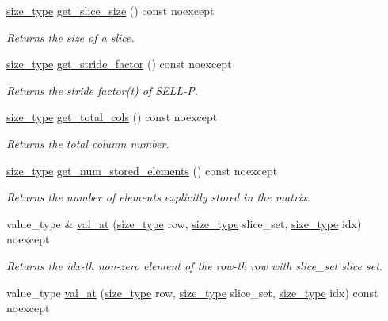 \begin{DoxyCompactItemize}
\hyperlink{namespacegko_a6e5c95df0ae4e47aab2f604a22d98ee7}{size\+\_\+type} \hyperlink{classgko_1_1matrix_1_1Sellp_a0554e79b672f35df5dd01cb467850227}{get\+\_\+slice\+\_\+size} () const noexcept
\begin{DoxyCompactList}\small\item\em Returns the size of a slice. \end{DoxyCompactList}\item 
\hyperlink{namespacegko_a6e5c95df0ae4e47aab2f604a22d98ee7}{size\+\_\+type} \hyperlink{classgko_1_1matrix_1_1Sellp_a34c7942cac3db5a9c4c0b609d2a5540b}{get\+\_\+stride\+\_\+factor} () const noexcept
\begin{DoxyCompactList}\small\item\em Returns the stride factor(t) of S\+E\+L\+L-\/P. \end{DoxyCompactList}\item 
\hyperlink{namespacegko_a6e5c95df0ae4e47aab2f604a22d98ee7}{size\+\_\+type} \hyperlink{classgko_1_1matrix_1_1Sellp_a3e5ca0f4968f29f97b5a42aac4d08b3d}{get\+\_\+total\+\_\+cols} () const noexcept
\begin{DoxyCompactList}\small\item\em Returns the total column number. \end{DoxyCompactList}\item 
\hyperlink{namespacegko_a6e5c95df0ae4e47aab2f604a22d98ee7}{size\+\_\+type} \hyperlink{classgko_1_1matrix_1_1Sellp_aab92660b6249e243e3ad35a51c557f3b}{get\+\_\+num\+\_\+stored\+\_\+elements} () const noexcept
\begin{DoxyCompactList}\small\item\em Returns the number of elements explicitly stored in the matrix. \end{DoxyCompactList}\item 
value\+\_\+type \& \hyperlink{classgko_1_1matrix_1_1Sellp_a0654ed1e0f066c8b9a15aaaeeea34030}{val\+\_\+at} (\hyperlink{namespacegko_a6e5c95df0ae4e47aab2f604a22d98ee7}{size\+\_\+type} row, \hyperlink{namespacegko_a6e5c95df0ae4e47aab2f604a22d98ee7}{size\+\_\+type} slice\+\_\+set, \hyperlink{namespacegko_a6e5c95df0ae4e47aab2f604a22d98ee7}{size\+\_\+type} idx) noexcept
\begin{DoxyCompactList}\small\item\em Returns the {\ttfamily idx}-\/th non-\/zero element of the {\ttfamily row}-\/th row with {\ttfamily slice\+\_\+set} slice set. \end{DoxyCompactList}\item 
value\+\_\+type \hyperlink{classgko_1_1matrix_1_1Sellp_ad4bb228252469da6e57eb38edd66fb8e}{val\+\_\+at} (\hyperlink{namespacegko_a6e5c95df0ae4e47aab2f604a22d98ee7}{size\+\_\+type} row, \hyperlink{namespacegko_a6e5c95df0ae4e47aab2f604a22d98ee7}{size\+\_\+type} slice\+\_\+set, \hyperlink{namespacegko_a6e5c95df0ae4e47aab2f604a22d98ee7}{size\+\_\+type} idx) const noexcept

\end{DoxyCompactItemize}
